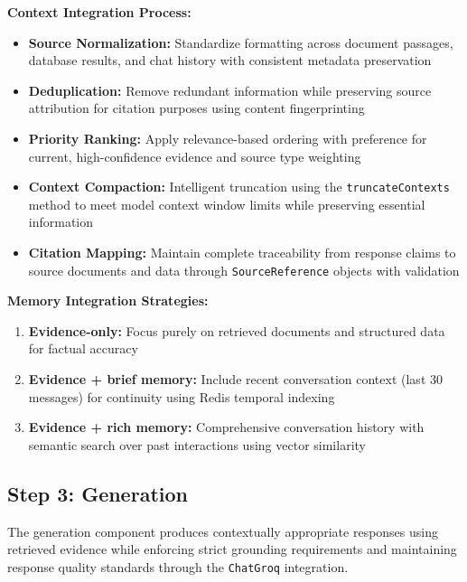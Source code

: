 \textbf{Context Integration Process:}
\begin{itemize}
    \item \textbf{Source Normalization:} Standardize formatting across document passages, database results, and chat history with consistent metadata preservation
    \item \textbf{Deduplication:} Remove redundant information while preserving source attribution for citation purposes using content fingerprinting
    \item \textbf{Priority Ranking:} Apply relevance-based ordering with preference for current, high-confidence evidence and source type weighting
    \item \textbf{Context Compaction:} Intelligent truncation using the \texttt{truncateContexts} method to meet model context window limits while preserving essential information
    \item \textbf{Citation Mapping:} Maintain complete traceability from response claims to source documents and data through \texttt{SourceReference} objects with validation
\end{itemize}

\textbf{Memory Integration Strategies:}
\begin{enumerate}
    \item \textbf{Evidence-only:} Focus purely on retrieved documents and structured data for factual accuracy
    \item \textbf{Evidence + brief memory:} Include recent conversation context (last 30 messages) for continuity using Redis temporal indexing
    \item \textbf{Evidence + rich memory:} Comprehensive conversation history with semantic search over past interactions using vector similarity
\end{enumerate}

\subsection{Step 3: Generation}
\label{subsec:generation_s2}

The generation component produces contextually appropriate responses using retrieved evidence while enforcing strict grounding requirements and maintaining response quality standards through the \texttt{ChatGroq} integration.

